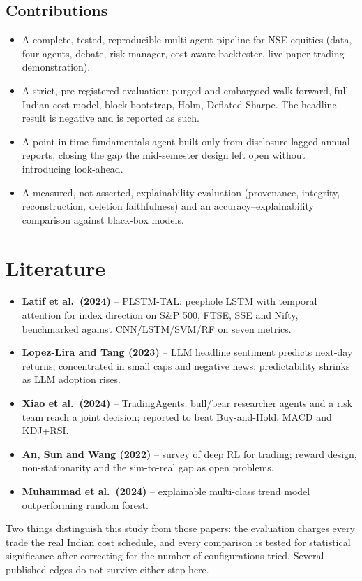 \documentclass[11pt,a4paper]{article}
\begin{document}
\subsection{Contributions}
\begin{itemize}
\item A complete, tested, reproducible multi-agent pipeline for NSE equities (data, four agents, debate, risk manager, cost-aware backtester, live paper-trading demonstration).
\item A strict, pre-registered evaluation: purged and embargoed walk-forward, full Indian cost model, block bootstrap, Holm, Deflated Sharpe. The headline result is negative and is reported as such.
\item A point-in-time fundamentals agent built only from disclosure-lagged annual reports, closing the gap the mid-semester design left open without introducing look-ahead.
\item A measured, not asserted, explainability evaluation (provenance, integrity, reconstruction, deletion faithfulness) and an accuracy--explainability comparison against black-box models.
\end{itemize}
\section{Literature}
\begin{itemize}
\item \textbf{Latif et al.\ (2024)} \citep{latif2024} -- PLSTM-TAL: peephole LSTM with temporal attention for index direction on S\&P 500, FTSE, SSE and Nifty, benchmarked against CNN/LSTM/SVM/RF on seven metrics.
\item \textbf{Lopez-Lira and Tang (2023)} \citep{lopezlira2023} -- LLM headline sentiment predicts next-day returns, concentrated in small caps and negative news; predictability shrinks as LLM adoption rises.
\item \textbf{Xiao et al.\ (2024)} \citep{xiao2024} -- TradingAgents: bull/bear researcher agents and a risk team reach a joint decision; reported to beat Buy-and-Hold, MACD and KDJ+RSI.
\item \textbf{An, Sun and Wang (2022)} \citep{an2022} -- survey of deep RL for trading; reward design, non-stationarity and the sim-to-real gap as open problems.
\item \textbf{Muhammad et al.\ (2024)} \citep{muhammad2024} -- explainable multi-class trend model outperforming random forest.
\end{itemize}
Two things distinguish this study from those papers: the evaluation charges every trade the real Indian cost schedule, and every comparison is tested for statistical significance after correcting for the number of configurations tried. Several published edges do not survive either step here.
\end{document}
